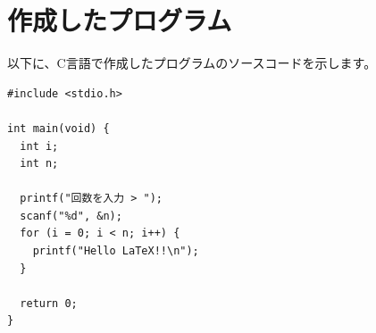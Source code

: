 \documentclass{ltjsarticle}
\begin{document}
\section{作成したプログラム}
以下に、C言語で作成したプログラムのソースコードを示します。
\begin{lstlisting}
#include <stdio.h>

int main(void) {
  int i;
  int n;

  printf("回数を入力 > ");
  scanf("%d", &n);
  for (i = 0; i < n; i++) {
    printf("Hello LaTeX!!\n");
  }

  return 0;
}
\end{lstlisting}
\end{document}

